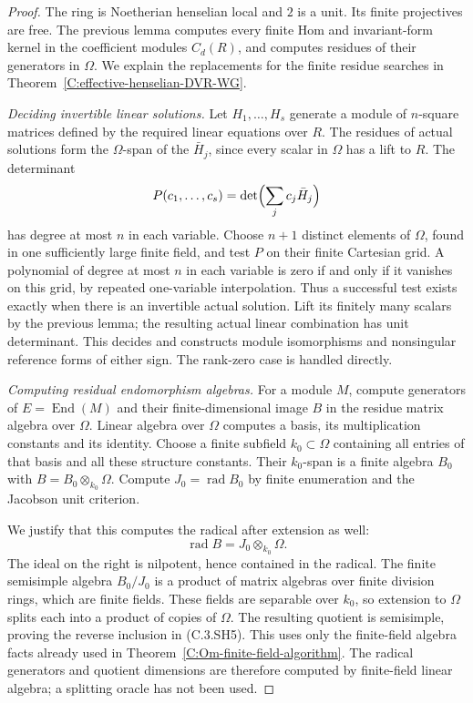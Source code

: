 \begin{proof}
The ring is Noetherian henselian local and
$2$ is a unit.  Its finite projectives are free.
The previous lemma computes every finite Hom
and invariant-form kernel in the coefficient
modules $C_d(R)$, and computes residues of their
generators in $\Omega$.
We explain the replacements for the finite
residue searches in
Theorem~\ref{C:effective-henselian-DVR-WG}.

\emph{Deciding invertible linear solutions.}
Let $H_1,\ldots,H_s$ generate a module of
$n$-square matrices defined by the required
linear equations over $R$.
The residues of actual solutions form the
$\Omega$-span of the $\bar H_j$, since every
scalar in $\Omega$ has a lift to $R$.
The determinant
\[
             P(c_1,\ldots,c_s)
                =\det\Bigl(\sum_j c_j\bar H_j\Bigr)
\]
has degree at most $n$ in each variable.
Choose $n+1$ distinct elements of $\Omega$,
found in one sufficiently large finite field,
and test $P$ on their finite Cartesian grid.
A polynomial of degree at most $n$ in each
variable is zero if and only if it vanishes
on this grid, by repeated one-variable interpolation.
Thus a successful test exists exactly when
there is an invertible actual solution.
Lift its finitely many scalars by the previous
lemma; the resulting actual linear combination
has unit determinant.  This decides and constructs
module isomorphisms and nonsingular reference
forms of either sign.  The rank-zero case is
handled directly.

\emph{Computing residual endomorphism algebras.}
For a module $M$, compute generators of
$E=\operatorname{End}(M)$ and their finite-dimensional
image $B$ in the residue matrix algebra over
$\Omega$.  Linear algebra over $\Omega$ computes
a basis, its multiplication constants and its
identity.  Choose a finite subfield $k_0\subset\Omega$
containing all entries of that basis and all
these structure constants.  Their $k_0$-span
is a finite algebra $B_0$ with
$B=B_0\otimes_{k_0}\Omega$.
Compute $J_0=\operatorname{rad}B_0$ by finite
enumeration and the Jacobson unit criterion.

We justify that this computes the radical after
extension as well:
\[
       \operatorname{rad}B=J_0\otimes_{k_0}\Omega.          \tag{C.3.SH5}
\]
The ideal on the right is nilpotent, hence
contained in the radical.  The finite semisimple
algebra $B_0/J_0$ is a product of matrix algebras
over finite division rings, which are finite
fields.  These fields are separable over $k_0$,
so extension to $\Omega$ splits each into a
product of copies of $\Omega$.  The resulting
quotient is semisimple, proving the reverse
inclusion in (C.3.SH5).  This uses only the
finite-field algebra facts already used in
Theorem~\ref{C:Om-finite-field-algorithm}.
The radical generators and quotient dimensions
are therefore computed by finite-field linear
algebra; a splitting oracle has not been used.


\end{proof}
